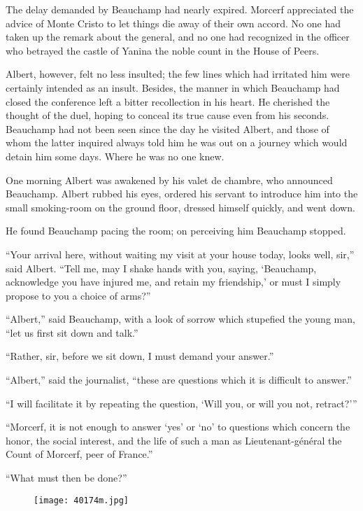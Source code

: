 The delay demanded by Beauchamp had nearly expired. Morcerf appreciated
the advice of Monte Cristo to let things die away of their own accord.
No one had taken up the remark about the general, and no one had
recognized in the officer who betrayed the castle of Yanina the noble
count in the House of Peers.

Albert, however, felt no less insulted; the few lines which had
irritated him were certainly intended as an insult. Besides, the manner
in which Beauchamp had closed the conference left a bitter recollection
in his heart. He cherished the thought of the duel, hoping to conceal
its true cause even from his seconds. Beauchamp had not been seen since
the day he visited Albert, and those of whom the latter inquired always
told him he was out on a journey which would detain him some days.
Where he was no one knew.

One morning Albert was awakened by his valet de chambre, who announced
Beauchamp. Albert rubbed his eyes, ordered his servant to introduce him
into the small smoking-room on the ground floor, dressed himself
quickly, and went down.

He found Beauchamp pacing the room; on perceiving him Beauchamp
stopped.

“Your arrival here, without waiting my visit at your house today, looks
well, sir,” said Albert. “Tell me, may I shake hands with you, saying,
‘Beauchamp, acknowledge you have injured me, and retain my friendship,’
or must I simply propose to you a choice of arms?”

“Albert,” said Beauchamp, with a look of sorrow which stupefied the
young man, “let us first sit down and talk.”

“Rather, sir, before we sit down, I must demand your answer.”

“Albert,” said the journalist, “these are questions which it is
difficult to answer.”

“I will facilitate it by repeating the question, ‘Will you, or will you
not, retract?’”

“Morcerf, it is not enough to answer ‘yes’ or ‘no’ to questions which
concern the honor, the social interest, and the life of such a man as
Lieutenant-général the Count of Morcerf, peer of France.”

“What must then be done?”

\begin{figure}[ht]
\texttt{[image: 40174m.jpg]}
\end{figure}

